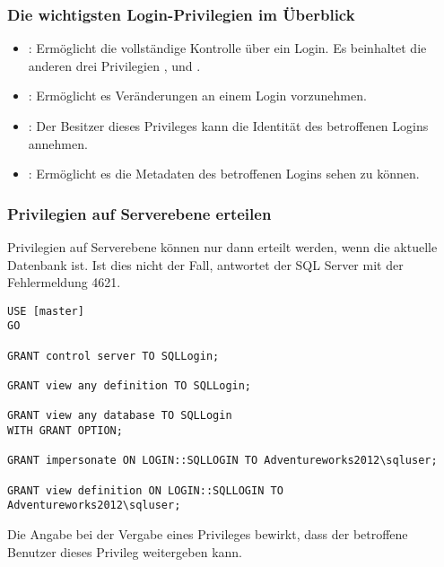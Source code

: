        \subsubsection{Die wichtigsten Login-Privilegien im Überblick}
          \begin{itemize}
            \item {}: Ermöglicht die vollständige Kontrolle über
            ein Login. Es beinhaltet die anderen drei Privilegien
            ,  und .
            \item {}: Ermöglicht es Veränderungen an einem Login
            vorzunehmen.
            \item {}: Der Besitzer dieses Privileges kann
            die Identität des betroffenen Logins annehmen.
            \item {}: Ermöglicht es die Metadaten des
            betroffenen Logins sehen zu können.
          \end{itemize}
        \subsubsection{Privilegien auf Serverebene erteilen}
          \begin{merke}
            Privilegien auf Serverebene können nur dann erteilt werden, wenn die
            aktuelle Datenbank  ist. Ist dies nicht der Fall,
            antwortet der SQL Server mit der Fehlermeldung 4621.
          \end{merke}
          \begin{lstlisting}[language=ms_sql, caption={Privilegien auf
          ein Server- oder Login-Objekt erteilen}, label=admin19_05a]
USE [master]
GO

GRANT control server TO SQLLogin;

GRANT view any definition TO SQLLogin;

GRANT view any database TO SQLLogin
WITH GRANT OPTION;

GRANT impersonate ON LOGIN::SQLLOGIN TO Adventureworks2012\sqluser;

GRANT view definition ON LOGIN::SQLLOGIN TO Adventureworks2012\sqluser;
          \end{lstlisting}
          Die Angabe  bei der Vergabe eines
          Privileges bewirkt, dass der betroffene Benutzer dieses Privileg
          weitergeben kann.
          \begin{literaturinternet}
            \item \cite{ms178640}
            \item \cite{ms186717}
          \end{literaturinternet}
